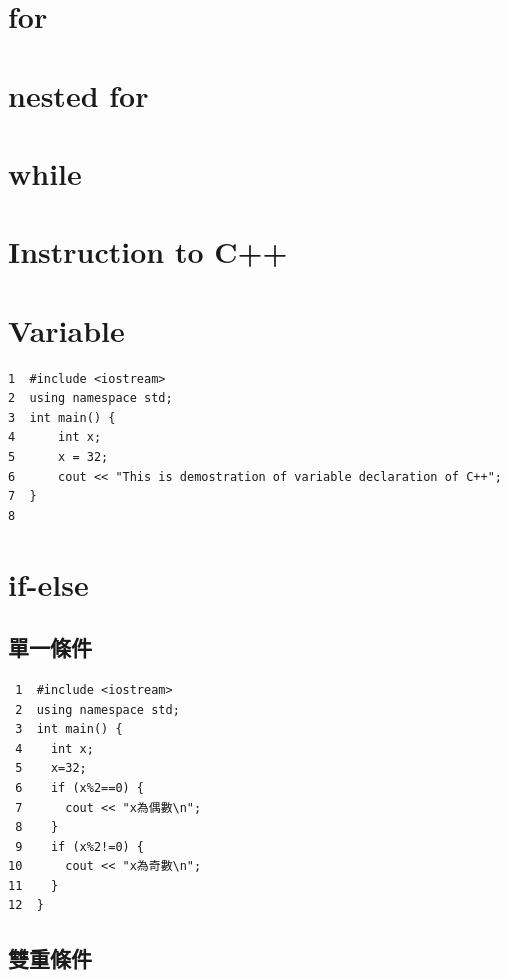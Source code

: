 \documentclass[12pt,a4paper]{article}
\begin{document}
\section*{for}
\label{sec:org98b9d76}

\section*{nested for}
\label{sec:org9576e82}

\section*{while}
\label{sec:org317a12b}

\section*{Instruction to C++}
\label{sec:orgd38e9dd}

\section*{Variable}
\label{sec:org3c5589b}

\begin{verbatim}
1  #include <iostream>
2  using namespace std;
3  int main() {
4      int x;
5      x = 32;
6      cout << "This is demostration of variable declaration of C++";
7  }
8  
\end{verbatim}

\section*{if-else}
\label{sec:org61c7807}

\subsection*{單一條件}
\label{sec:orgfd3d448}
\begin{verbatim}
 1  #include <iostream>
 2  using namespace std;
 3  int main() {
 4    int x;
 5    x=32;
 6    if (x%2==0) {
 7      cout << "x為偶數\n";
 8    }
 9    if (x%2!=0) {
10      cout << "x為奇數\n";
11    }
12  }
\end{verbatim}

\subsection*{雙重條件}
\label{sec:org2b5a5b3}
\end{document}
